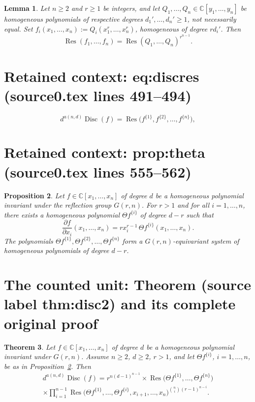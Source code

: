 \documentclass[10pt,a4paper]{amsart}
\newcommand{\Disc}{\operatorname{Disc}}
\newcommand{\Res}{\operatorname{Res}}
\theoremstyle{plain}
\newtheorem{theorem}{Theorem}[section]
\newtheorem{proposition}[theorem]{Proposition}
\newtheorem{lemma}[theorem]{Lemma}
\theoremstyle{definition}
\begin{document}
\begin{lemma}
\label{lem:powersubstitution}
Let $n \geqslant 2$ and $r \geqslant 1$ be integers, and let $Q_1,\dots,Q_n \in \mathbb{C}[y_1,\dots,y_n]$ be homogeneous polynomials of respective degrees $d_1',\dots,d_n' \geqslant 1$, not necessarily equal. Set $f_i(x_1,\dots,x_n) := Q_i(x_1^r,\dots,x_n^r)$, homogeneous of degree $r d_i'$. Then
\[
\Res(f_1,\dots,f_n) = \Res(Q_1,\dots,Q_n)^{r^{n-1}}.
\]
\end{lemma}


\section*{Retained context: eq:discres (source0.tex lines 491--494)}

\begin{equation}
\label{eq:discres}
d^{a(n,d)}\Disc(f) = \Res\big(f^{\{1\}},f^{\{2\}},\dots,f^{\{n\}}\big),
\end{equation}


\section*{Retained context: prop:theta (source0.tex lines 555--562)}

\begin{proposition}
\label{prop:theta}
Let $f \in \mathbb{C}[x_1,\dots,x_n]$ of degree $d$ be a homogeneous polynomial invariant under the reflection group $G(r,n)$. For $r>1$ and for all $i=1,\dots,n$, there exists a homogeneous polynomial $\Theta f^{\{i\}}$ of degree $d-r$ such that
\[
\frac{\partial f}{\partial x_i}(x_1,\dots,x_n) = r x_i^{r-1}\, \Theta f^{\{i\}}(x_1,\dots,x_n).
\]
The polynomials $\Theta f^{\{1\}},\Theta f^{\{2\}},\dots,\Theta f^{\{n\}}$ form a $G(r,n)$-equivariant system of homogeneous polynomials of degree $d-r$.
\end{proposition}


\section{The counted unit: Theorem (source label thm:disc2) and its complete original proof}

\begin{theorem}
\label{thm:disc2}
Let $f \in \mathbb{C}[x_1,\dots,x_n]$ of degree $d$ be a homogeneous polynomial invariant under $G(r,n)$. Assume $n\geqslant 2$, $d\geqslant 2$, $r>1$, and let $\Theta f^{\{i\}}$, $i=1,\dots,n$, be as in Proposition~\ref{prop:theta}. Then
\begin{multline*}
d^{a(n,d)}\Disc(f) = r^{n(d-1)^{n-1}} \times \Res\big(\Theta f^{\{1\}},\dots,\Theta f^{\{n\}}\big) \\
\times \prod_{i=1}^{n-1} \Res\big(\Theta f^{\{1\}},\dots,\Theta f^{\{i\}}, x_{i+1},\dots,x_n\big)^{\binom{n}{i}(r-1)^{n-i}}.
\end{multline*}
\end{theorem}
\end{document}
